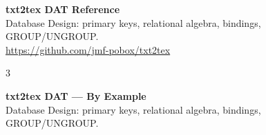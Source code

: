 \documentclass[10pt,landscape,a4paper]{article}
\begin{document}
\begin{center}
{\LARGE\bfseries txt2tex DAT Reference}\\[2pt]
{\small Database Design: primary keys, relational algebra, bindings, GROUP/UNGROUP.}\\[1pt]
{\footnotesize\color{gray}\url{https://github.com/jmf-pobox/txt2tex}}
\end{center}

\vspace{-2pt}

\begin{multicols}{3}
\raggedcolumns



\end{multicols}

\newpage

\begin{center}
{\LARGE\bfseries txt2tex DAT --- By Example}\\[2pt]
{\small Database Design: primary keys, relational algebra, bindings, GROUP/UNGROUP.}
\end{center}

\vspace{-2pt}
\end{document}
